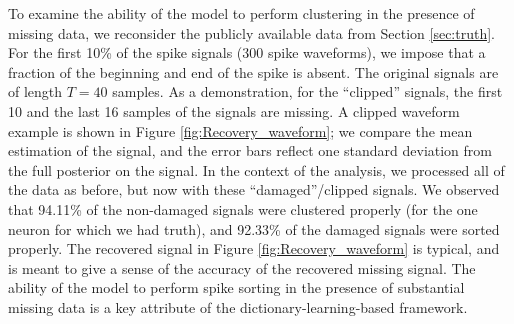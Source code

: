 \documentclass[journal]{IEEEtran}
\begin{document}
To examine the ability of the model to perform clustering in the
presence of missing data, we reconsider the publicly available data
from Section \ref{sec:truth}. For the first 10\% of the spike
signals (300 spike waveforms), we impose that a fraction of
the beginning and end of the spike is absent. The original signals
are of length $T=40$ samples. As a demonstration, for the ``clipped'' signals, the first 10 and the last 16 samples of the
signals are missing. A clipped waveform example is shown in Figure \ref{fig:Recovery_waveform}; we compare the mean estimation of the signal, and the error bars reflect one standard deviation from the full posterior on the signal.
In the context of the analysis, we processed all of the data as before, but now with these ``damaged''/clipped signals. We observed that 94.11\% of the non-damaged signals were clustered properly (for the one neuron for which we had truth), and 92.33\% of the damaged signals were sorted properly. The recovered signal in Figure \ref{fig:Recovery_waveform} is typical, and is meant to give a sense of the accuracy of the recovered missing signal. The ability of the model to perform spike sorting in the presence of substantial missing data is a key attribute of the dictionary-learning-based framework. 

\end{document}
